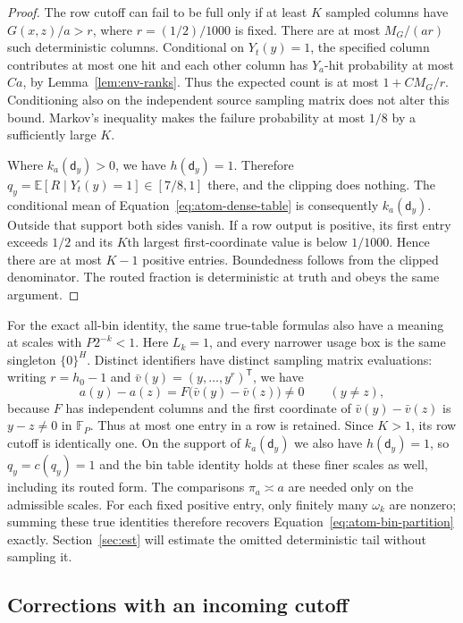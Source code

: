\begin{proof}
The row cutoff can fail to be full only if at least $K$ sampled columns
have $G(x,z)/a>r$, where $r=(1/2)/1000$ is fixed.
There are at most $M_G/(ar)$ such deterministic columns.
Conditional on $Y_t(y)=1$, the specified column contributes at most one
hit and each other column has $Y_a$-hit probability at most $C a$, by
Lemma~\ref{lem:env-ranks}.  Thus the expected count is at most
$1+CM_G/r$.  Conditioning also on the independent source sampling matrix does
not alter this bound.  Markov's inequality makes the failure probability
at most $1/8$ by a sufficiently large $K$.

Where $k_a(\mathsf{d}_y)>0$, we have $h(\mathsf{d}_y)=1$.  Therefore
$q_y=\mathbb E[R\mid Y_t(y)=1]\in[7/8,1]$ there, and the clipping
does nothing.  The conditional mean of Equation~\eqref{eq:atom-dense-table}
is consequently $k_a(\mathsf{d}_y)$.  Outside that support both sides vanish.
If a row output is positive, its first entry exceeds $1/2$ and its
$K$th largest first-coordinate value is below $1/1000$.  Hence there are at most $K-1$
positive entries.  Boundedness follows from the clipped denominator.  The routed
fraction is deterministic at truth and obeys the same argument.
\end{proof}

For the exact all-bin identity, the same true-table formulas also have a
meaning at scales with $P2^{-k}<1$. Here $L_k=1$, and every narrower usage box is the same
singleton $\{0\}^H$. Distinct identifiers have distinct sampling matrix
evaluations: writing $r=h_0-1$ and
$\bar v(y)=(y,\ldots,y^r)^{\mathsf T}$, we have
\[
 a(y)-a(z)=F\bigl(\bar v(y)-\bar v(z)\bigr)\ne0
 \qquad(y\ne z),
\]
because $F$ has independent columns and the first coordinate of
$\bar v(y)-\bar v(z)$ is $y-z\ne0$ in $\mathbb F_P$.
Thus at most one entry in a row is retained. Since $K>1$, its row
cutoff is identically one. On the support of $k_a(\mathsf{d}_y)$ we also have
$h(\mathsf{d}_y)=1$, so $q_y=c(q_y)=1$ and the bin table identity holds at
these finer scales as well, including its routed form. The comparisons
$\pi_a\asymp a$ are needed only on the admissible scales.
For each fixed positive entry, only finitely many $\omega_k$ are
nonzero; summing these true identities therefore recovers
Equation~\eqref{eq:atom-bin-partition} exactly. Section~\ref{sec:est}
will estimate the omitted deterministic tail without sampling it.

\subsection{Corrections with an incoming cutoff}

